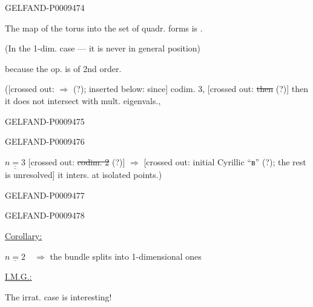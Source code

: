\begin{GelfandAdjacentEvidence}{GELFAND-P000947}{4}


The map of the torus into the set of quadr. forms is .

(In the 1-dim. case --- it is never in general position)

because the op. is of 2nd order.

([crossed out: $\Rightarrow$ (?); inserted below: since] codim. 3,
[crossed out: \sout{then} (?)] then it does not intersect with mult. eigenvals.,
\end{GelfandAdjacentEvidence}
\begin{GelfandAdjacentEvidence}{GELFAND-P000947}{5}

\end{GelfandAdjacentEvidence}
\begin{GelfandAdjacentEvidence}{GELFAND-P000947}{6}


$\underline{\underline{n=3}}$ [crossed out: \sout{codim. 2} (?)] $\Rightarrow$
[crossed out: initial Cyrillic “в” (?); the rest is unresolved] it inters. at isolated points.)
\end{GelfandAdjacentEvidence}
\begin{GelfandAdjacentEvidence}{GELFAND-P000947}{7}

\end{GelfandAdjacentEvidence}
\begin{GelfandAdjacentEvidence}{GELFAND-P000947}{8}

\end{GelfandAdjacentEvidence}


\underline{\underline{Corollary:}}

$\underline{n=2}\quad\Rightarrow$ the bundle splits into 1-dimensional ones

\underline{\underline{I.M.G.:}}

The irrat. case is interesting!

